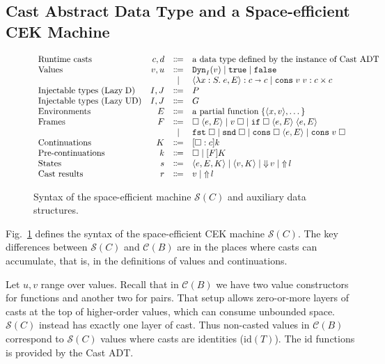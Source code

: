 \documentclass[runningheads]{llncs}
\newcommand{\stxrule}[3]{\text{#2} & #1 & \Coloneqq & #3\\}
\newcommand{\stxrulecont}[1]{& & | & #1 \\}
\newcommand{\figref}[1]{Fig.~\ref{#1}}
\newcommand{\LUD}{\ensuremath{\text{Lazy\;UD}}}
\newcommand{\LD}{\ensuremath{\text{Lazy\;D}}}
\newcommand{\CMachine}[1]{\ensuremath{\mathcal{C}(#1)}}
\newcommand{\SMachine}[1]{\ensuremath{\mathcal{S}(#1)}}
\newcommand{\error}[1]{\ensuremath{\mathop{\Uparrow}#1}}
\newcommand{\Pfunc}[2]{\ensuremath{#1 \shortrightarrow #2}}
\newcommand{\Pprod}[2]{\ensuremath{#1 \times #2}}
\newcommand{\elam}[3]{\lambda#1:#2.\;#3}
\newcommand{\eapp}[2]{#1\;#2}
\newcommand{\eif}[3]{\mathtt{if}\;#1\;#2\;#3}
\newcommand{\econs}[2]{\mathtt{cons} \; #1 \; #2}
\newcommand{\efst}[1]{\mathtt{fst} \; #1}
\newcommand{\esnd}[1]{\mathtt{snd} \; #1}
\newcommand{\ecast}[2]{\ensuremath{#1 : #2}}
\newcommand{\vdyn}[2]{\mathtt{Dyn}_{#1}(#2)}
\newcommand{\vtrue}[0]{\mathtt{true}}
\newcommand{\vfalse}[0]{\mathtt{false}}
\newcommand{\vfunc}[4]{\langle\elam{#1}{#2}{#3},#4\rangle}
\newcommand{\vcons}[2]{\econs{#1}{#2}}
\newcommand{\sexpr}[3]{\ensuremath{\langle#1,#2,#3\rangle}}
\newcommand{\scont}[2]{\ensuremath{\langle#1,#2\rangle}}
\newcommand{\shalt}[1]{\ensuremath{\mathop{\Downarrow} #1}}
\newcommand{\Knil}[0]{\Box}
\newcommand{\Kcons}[2]{[#1]#2}
\newcommand{\closure}[2]{\langle#1,#2\rangle}
\newcommand{\FappXO}[2]{\eapp{\square}{\closure{#1}{#2}}}
\newcommand{\FappOX}[1]{\eapp{#1}{\square}}
\newcommand{\Fif}[3]{\eif{\square}{\closure{#1}{#3}}{\closure{#2}{#3}}}
\newcommand{\FconsXO}[2]{\econs{\square}{\closure{#1}{#2}}}
\newcommand{\FconsOX}[1]{\econs{#1}{\square}}
\newcommand{\Ffst}[0]{\efst{\square}}
\newcommand{\Fsnd}[0]{\esnd{\square}}
\newcommand{\Fcast}[1]{\ecast{\square}{#1}}
\begin{document}
\subsection{Cast Abstract Data Type and a Space-efficient CEK Machine}
\label{sec:cast-adt-and-space-efficient-cek}

\begin{figure}[tp]
	\[
	\begin{array}{lrcl}
	\stxrule{c,d}{Runtime casts}{\text{a data type defined by the 
	instance of Cast ADT}}
	\stxrule{v,u}{Values}{
		\vdyn{I}{v}  \mid
		\vtrue       \mid
		\vfalse                     
	}
	\stxrulecont{
		\ecast{\vfunc{x}{S}{e}{E}}{\Pfunc{c}{c}} \mid
		\ecast{\vcons{v}{v}}{\Pprod{c}{c}}
	}
	\stxrule{I,J}{Injectable types (\LD)}{P}
	\stxrule{I,J}{Injectable types (\LUD)}{G}
	\stxrule{E}{Environments}{
		\text{a partial function}\;\{\langle x , v \rangle , \dots \}
	}
	\stxrule{F}{Frames}{
		\FappXO{e}{E}  \mid
		\FappOX{v}     \mid
		\Fif{e}{e}{E}
	}
	\stxrulecont{
		\Ffst \mid
		\Fsnd \mid
		\FconsXO{e}{E}  \mid
		\FconsOX{v}
	}
	\stxrule{K}{Continuations}{
		\Kcons{\Fcast{c}}{k}
	}
	\stxrule{k}{Pre-continuations}{
		\Knil         \mid
		\Kcons{F}{K}
	}
	\stxrule{s}{States}{
		\sexpr{e}{E}{K}  \mid
		\scont{v}{K}     \mid
		\shalt{v}        \mid
		\error{l}
	}
	\stxrule{r}{Cast results}{
		v \mid
		\error{l}
	}
	\end{array}
	\]
	
	\caption{Syntax of the space-efficient machine \SMachine{C} and auxiliary 
	data structures.}
	\label{fig:SEMachine-state}
\end{figure}

\figref{fig:SEMachine-state} defines the syntax of the space-efficient
CEK machine \SMachine{C}.  The key differences between \SMachine{C}
and \CMachine{B} are in the places where casts can accumulate, that
is, in the definitions of values and continuations.

Let $u,v$ range over values.
%
Recall that in \CMachine{B} we have two value constructors for
functions and another two for pairs. That setup allows zero-or-more
layers of casts at the top of higher-order values, which can consume
unbounded space.
%
\SMachine{C} instead has exactly one layer of cast.
Thus non-casted values in \CMachine{B} correspond to \SMachine{C} values
where casts are identities ($\mathrm{id}(T)$). The 
$\mathrm{id}$ functions is provided by the Cast ADT.
\end{document}
